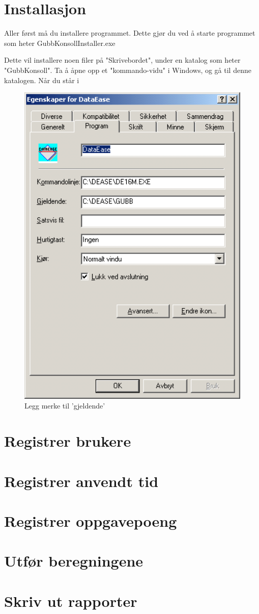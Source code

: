 \documentclass[12pt]{book}
\begin{document}
\section{Installasjon}

Aller først må du installere programmet. Dette gjør du ved å starte programmet som heter GubbKonsollInstaller.exe

Dette vil installere noen filer på "Skrivebordet", under en katalog som heter "GubbKonsoll". Ta å åpne opp et "kommando-vidu" i Windows, og gå til denne katalogen. Når du står i 


\begin{figure}
\centering
\includegraphics[width=12.0cm]{bilde}
\caption{Legg merke til  'gjeldende'}
\end{figure}


\section{Registrer brukere}

\section{Registrer anvendt tid}

\section{Registrer oppgavepoeng}

\section{Utfør beregningene}

\section{Skriv ut rapporter}
\end{document}
